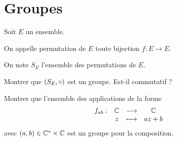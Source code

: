 \begin{corr}
\end{corr}

\section{Groupes}

\begin{exo}
Soit \(E\) un ensemble.

On appelle permutation de \(E\) toute bijection \(f:E\to E\).

On note \(S_E\) l'ensemble des permutations de \(E\).

Montrer que \(\groupe{S_E}[\rond]\) est un groupe. Est-il commutatif ?
\end{exo}

\begin{corr}
\end{corr}

\begin{exo}
Montrer que l'ensemble des applications de la forme \[\begin{array}[t]{cccc}f_{ab} : & \mathbb{C} & \longrightarrow & \mathbb{C} \\ & z & \longmapsto & az+b\end{array}\] avec \(\left(a,b\right)\in\mathbb{C}^*\times\mathbb{C}\) est un groupe pour la composition.
\end{exo}

\begin{corr}
\end{corr}

